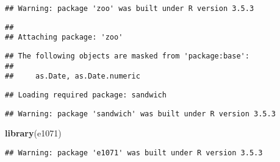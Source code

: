 \documentclass[]{article}
\newenvironment{Shaded}{\begin{snugshade}}{\end{snugshade}}
\newcommand{\KeywordTok}[1]{\textcolor[rgb]{0.13,0.29,0.53}{\textbf{#1}}}
\newcommand{\DecValTok}[1]{\textcolor[rgb]{0.00,0.00,0.81}{#1}}
\newcommand{\StringTok}[1]{\textcolor[rgb]{0.31,0.60,0.02}{#1}}
\newcommand{\CommentTok}[1]{\textcolor[rgb]{0.56,0.35,0.01}{\textit{#1}}}
\newcommand{\OperatorTok}[1]{\textcolor[rgb]{0.81,0.36,0.00}{\textbf{#1}}}
\newcommand{\NormalTok}[1]{#1}
\begin{document}
\begin{verbatim}
## Warning: package 'zoo' was built under R version 3.5.3
\end{verbatim}

\begin{verbatim}
## 
## Attaching package: 'zoo'
\end{verbatim}

\begin{verbatim}
## The following objects are masked from 'package:base':
## 
##     as.Date, as.Date.numeric
\end{verbatim}

\begin{verbatim}
## Loading required package: sandwich
\end{verbatim}

\begin{verbatim}
## Warning: package 'sandwich' was built under R version 3.5.3
\end{verbatim}

\begin{Shaded}
\begin{Highlighting}[]
\KeywordTok{library}\NormalTok{(e1071)}
\end{Highlighting}
\end{Shaded}

\begin{verbatim}
## Warning: package 'e1071' was built under R version 3.5.3
\end{verbatim}

\begin{Shaded}
\end{Shaded}
\end{document}
